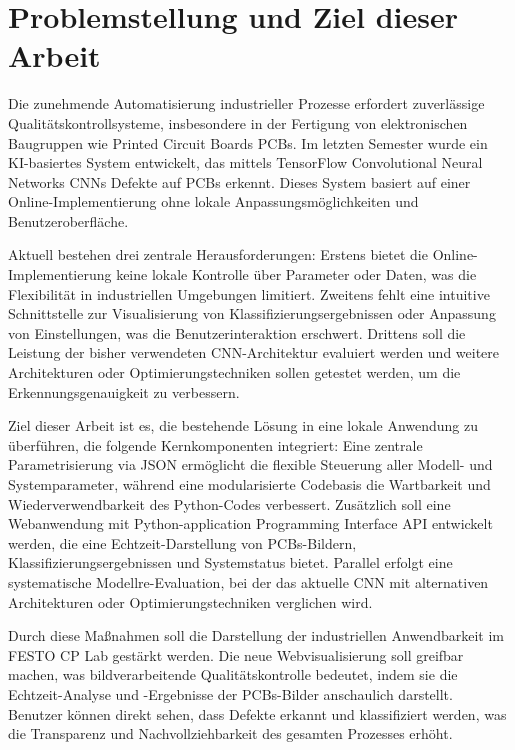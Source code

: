 \chapter{Problemstellung und Ziel dieser Arbeit} \label{chap:problemstellung_und_ziel_dieser_arbeit}

Die zunehmende Automatisierung industrieller Prozesse erfordert zuverlässige Qualitätskontrollsysteme, insbesondere in der Fertigung von elektronischen Baugruppen wie Printed Circuit Boards \acp{PCB}. Im letzten Semester wurde ein KI-basiertes System entwickelt, das mittels TensorFlow Convolutional Neural Networks \acp{CNN} 
Defekte auf \acp{PCB} erkennt. Dieses System basiert auf einer Online-Implementierung ohne lokale Anpassungsmöglichkeiten und Benutzeroberfläche. 

Aktuell bestehen drei zentrale Herausforderungen: Erstens bietet die Online- Implementierung keine lokale Kontrolle über Parameter oder Daten, was die Flexibilität in industriellen Umgebungen limitiert. Zweitens fehlt eine intuitive Schnittstelle zur Visualisierung von 
Klassifizierungsergebnissen oder Anpassung von Einstellungen, was die Benutzerinteraktion erschwert. Drittens soll die Leistung der bisher verwendeten \ac{CNN}-Architektur evaluiert werden und weitere Architekturen oder Optimierungstechniken sollen getestet werden, um die
Erkennungsgenauigkeit zu verbessern.  

Ziel dieser Arbeit ist es, die bestehende Lösung in eine lokale Anwendung zu überführen, die folgende Kernkomponenten integriert: Eine zentrale Parametrisierung via JSON ermöglicht die flexible Steuerung aller Modell- und Systemparameter, während eine 
modularisierte Codebasis die Wartbarkeit und Wiederverwendbarkeit des Python-Codes verbessert. Zusätzlich soll eine Webanwendung mit Python-application Programming Interface \ac{API} entwickelt werden, die eine Echtzeit-Darstellung von \acp{PCB}-Bildern, Klassifizierungsergebnissen und Systemstatus bietet. 
Parallel erfolgt eine systematische Modellre-Evaluation, bei der das aktuelle \ac{CNN} mit alternativen Architekturen oder Optimierungstechniken verglichen wird.

Durch diese Maßnahmen soll die Darstellung der industriellen Anwendbarkeit im FESTO CP Lab gestärkt werden. Die neue Webvisualisierung soll greifbar machen, was bildverarbeitende Qualitätskontrolle bedeutet, indem sie die Echtzeit-Analyse und -Ergebnisse der \acp{PCB}-Bilder anschaulich darstellt. Benutzer können direkt sehen, dass Defekte erkannt und klassifiziert werden, was die Transparenz und Nachvollziehbarkeit des gesamten Prozesses erhöht.